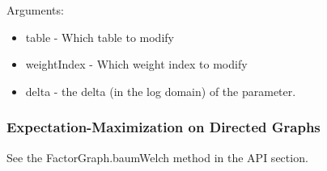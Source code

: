 Arguments:
\begin{itemize}
\item table - Which table to modify
\item weightIndex - Which weight index to modify
\item delta - the delta (in the log domain) of the parameter.
\end{itemize}



\subsubsection{Expectation-Maximization on Directed Graphs}

See the FactorGraph.baumWelch method in the API section.

%
%
%
